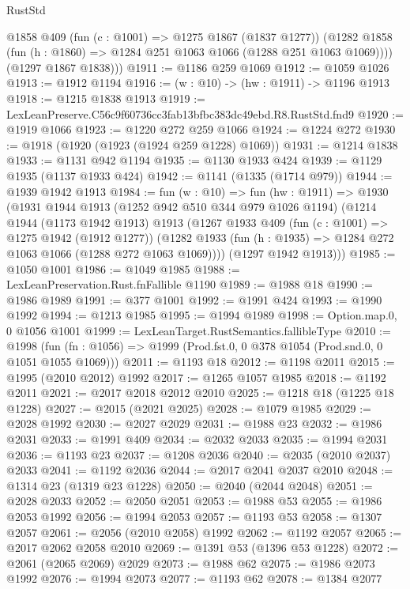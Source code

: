 \begin{lexlean}{RustStd}
\begin{coremodule}
          @1858
          @409
          (fun (c : @1001) => @1275 @1867 (@1837 @1277))
          (@1282 @1858 (fun (h : @1860) => @1284 @251 @1063 @1066 (@1288 @251 @1063 @1069))))
        (@1297 @1867 @1838)))
@1911 := @1186 @259 @1069
@1912 := @1059 @1026
@1913 := @1912 @1194
@1916 := (w : @10) -> (hw : @1911) -> @1196 @1913
@1918 := @1215 @1838 @1913
@1919 := LexLeanPreserve.C56c9f60736cc3fab13bfbc383dc49ebd.R8.RustStd.fnd9
@1920 := @1919 @1066
@1923 := @1220 @272 @259 @1066
@1924 := @1224 @272
@1930 := @1918 (@1920 (@1923 (@1924 @259 @1228) @1069))
@1931 := @1214 @1838
@1933 := @1131 @942 @1194
@1935 := @1130 @1933 @424
@1939 := @1129 @1935 (@1137 @1933 @424)
@1942 := @1141 (@1335 (@1714 @979))
@1944 := @1939 @1942 @1913
@1984 := fun (w : @10) =>
  fun (hw : @1911) =>
  @1930
    (@1931
      @1944
      @1913
      (@1252 @942 @510 @344 @979 @1026 @1194)
      (@1214
        @1944
        (@1173 @1942 @1913)
        @1913
        (@1267
          @1933
          @409
          (fun (c : @1001) => @1275 @1942 (@1912 @1277))
          (@1282 @1933 (fun (h : @1935) => @1284 @272 @1063 @1066 (@1288 @272 @1063 @1069))))
        (@1297 @1942 @1913)))
@1985 := @1050 @1001
@1986 := @1049 @1985
@1988 := LexLeanPreservation.Rust.fnFallible @1190
@1989 := @1988 @18
@1990 := @1986 @1989
@1991 := @377 @1001
@1992 := @1991 @424
@1993 := @1990 @1992
@1994 := @1213 @1985
@1995 := @1994 @1989
@1998 := Option.map.{0, 0} @1056 @1001
@1999 := LexLeanTarget.RustSemantics.fallibleType
@2010 := @1998
    (fun (fn : @1056) => @1999 (Prod.fst.{0, 0} @378 @1054 (Prod.snd.{0, 0} @1051 @1055 @1069)))
@2011 := @1193 @18
@2012 := @1198 @2011
@2015 := @1995 (@2010 @2012) @1992
@2017 := @1265 @1057 @1985
@2018 := @1192 @2011
@2021 := @2017 @2018 @2012 @2010
@2025 := @1218 @18 (@1225 @18 @1228)
@2027 := @2015 (@2021 @2025)
@2028 := @1079 @1985
@2029 := @2028 @1992
@2030 := @2027 @2029
@2031 := @1988 @23
@2032 := @1986 @2031
@2033 := @1991 @409
@2034 := @2032 @2033
@2035 := @1994 @2031
@2036 := @1193 @23
@2037 := @1208 @2036
@2040 := @2035 (@2010 @2037) @2033
@2041 := @1192 @2036
@2044 := @2017 @2041 @2037 @2010
@2048 := @1314 @23 (@1319 @23 @1228)
@2050 := @2040 (@2044 @2048)
@2051 := @2028 @2033
@2052 := @2050 @2051
@2053 := @1988 @53
@2055 := @1986 @2053 @1992
@2056 := @1994 @2053
@2057 := @1193 @53
@2058 := @1307 @2057
@2061 := @2056 (@2010 @2058) @1992
@2062 := @1192 @2057
@2065 := @2017 @2062 @2058 @2010
@2069 := @1391 @53 (@1396 @53 @1228)
@2072 := @2061 (@2065 @2069) @2029
@2073 := @1988 @62
@2075 := @1986 @2073 @1992
@2076 := @1994 @2073
@2077 := @1193 @62
@2078 := @1384 @2077

\end{coremodule}
\end{lexlean}

